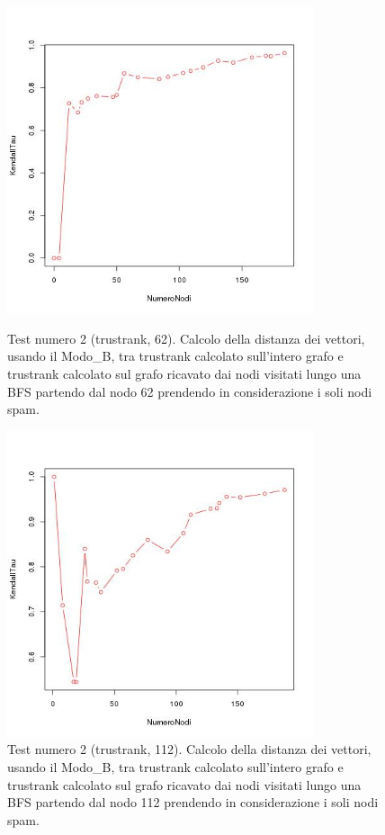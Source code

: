 \begin{figure}
\centering
 \includegraphics[height=9cm]{immagini/test2/trustrankBadNodesTestMode1_62}
 \caption{Test numero 2 (trustrank, 62). Calcolo della distanza dei vettori, usando il Modo\_B, tra trustrank calcolato sull'intero grafo e trustrank calcolato sul grafo ricavato dai nodi visitati lungo una BFS partendo dal nodo 62 prendendo in considerazione i soli nodi spam. }
 \label{fig:test2trustModoB62}
\centering
 \includegraphics[height=9cm]{immagini/test2/trustrankBadNodesTestMode1_112}
 \caption{Test numero 2 (trustrank, 112). Calcolo della distanza dei vettori, usando il Modo\_B, tra trustrank calcolato sull'intero grafo e trustrank calcolato sul grafo ricavato dai nodi visitati lungo una BFS partendo dal nodo 112 prendendo in considerazione i soli nodi spam.}
 \label{fig:test2trustModoB112}
\end{figure}

